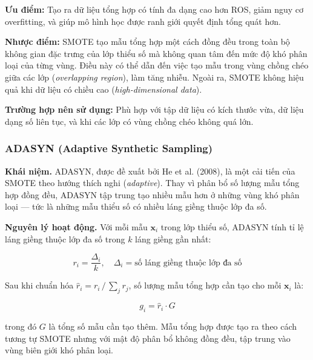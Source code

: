 \textbf{Ưu điểm:} Tạo ra dữ liệu tổng hợp có tính đa dạng cao hơn ROS, giảm nguy cơ overfitting, và giúp mô hình học được ranh giới quyết định tổng quát hơn.

\textbf{Nhược điểm:} SMOTE tạo mẫu tổng hợp một cách đồng đều trong toàn bộ không gian đặc trưng của lớp thiểu số mà không quan tâm đến mức độ khó phân loại của từng vùng. Điều này có thể dẫn đến việc tạo mẫu trong vùng chồng chéo giữa các lớp (\textit{overlapping region}), làm tăng nhiễu. Ngoài ra, SMOTE không hiệu quả khi dữ liệu có chiều cao (\textit{high-dimensional data}).

\textbf{Trường hợp nên sử dụng:} Phù hợp với tập dữ liệu có kích thước vừa, dữ liệu dạng số liên tục, và khi các lớp có vùng chồng chéo không quá lớn.

\subsubsection{ADASYN (Adaptive Synthetic Sampling)}

\textbf{Khái niệm.}
ADASYN, được đề xuất bởi He et al. (2008), là một cải tiến của SMOTE theo hướng thích nghi (\textit{adaptive}). Thay vì phân bổ số lượng mẫu tổng hợp đồng đều, ADASYN tập trung tạo nhiều mẫu hơn ở những vùng khó phân loại --- tức là những mẫu thiểu số có nhiều láng giềng thuộc lớp đa số.

\textbf{Nguyên lý hoạt động.}
Với mỗi mẫu $\mathbf{x}_i$ trong lớp thiểu số, ADASYN tính tỉ lệ láng giềng thuộc lớp đa số trong $k$ láng giềng gần nhất:

\begin{equation}
  r_i = \frac{\Delta_i}{k},
  \quad \Delta_i = \text{số láng giềng thuộc lớp đa số}
  \label{eq:adasyn_r}
\end{equation}

Sau khi chuẩn hóa $\hat{r}_i = r_i \,/\, \sum_{j} r_j$, số lượng mẫu tổng hợp cần tạo cho mỗi $\mathbf{x}_i$ là:

\begin{equation}
  g_i = \hat{r}_i \cdot G
  \label{eq:adasyn_g}
\end{equation}

\noindent trong đó $G$ là tổng số mẫu cần tạo thêm. Mẫu tổng hợp được tạo ra theo cách tương tự SMOTE nhưng với mật độ phân bổ không đồng đều, tập trung vào vùng biên giới khó phân loại.


